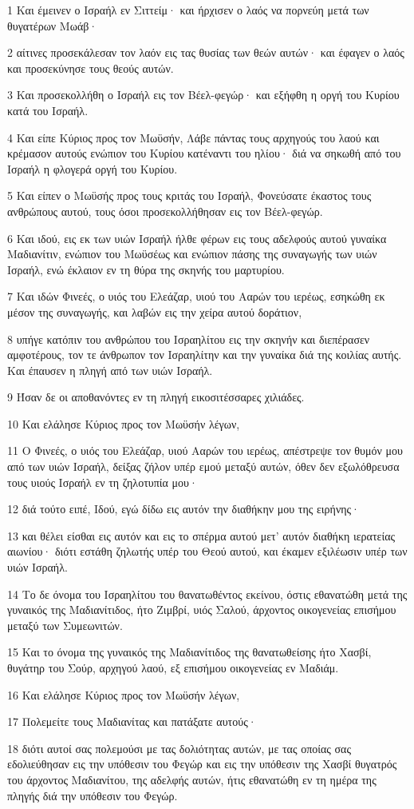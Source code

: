 \par 1 Και έμεινεν ο Ισραήλ εν Σιττείμ· και ήρχισεν ο λαός να πορνεύη μετά των θυγατέρων Μωάβ·
\par 2 αίτινες προσεκάλεσαν τον λαόν εις τας θυσίας των θεών αυτών· και έφαγεν ο λαός και προσεκύνησε τους θεούς αυτών.
\par 3 Και προσεκολλήθη ο Ισραήλ εις τον Βέελ-φεγώρ· και εξήφθη η οργή του Κυρίου κατά του Ισραήλ.
\par 4 Και είπε Κύριος προς τον Μωϋσήν, Λάβε πάντας τους αρχηγούς του λαού και κρέμασον αυτούς ενώπιον του Κυρίου κατέναντι του ηλίου· διά να σηκωθή από του Ισραήλ η φλογερά οργή του Κυρίου.
\par 5 Και είπεν ο Μωϋσής προς τους κριτάς του Ισραήλ, Φονεύσατε έκαστος τους ανθρώπους αυτού, τους όσοι προσεκολλήθησαν εις τον Βέελ-φεγώρ.
\par 6 Και ιδού, εις εκ των υιών Ισραήλ ήλθε φέρων εις τους αδελφούς αυτού γυναίκα Μαδιανίτιν, ενώπιον του Μωϋσέως και ενώπιον πάσης της συναγωγής των υιών Ισραήλ, ενώ έκλαιον εν τη θύρα της σκηνής του μαρτυρίου.
\par 7 Και ιδών Φινεές, ο υιός του Ελεάζαρ, υιού του Ααρών του ιερέως, εσηκώθη εκ μέσον της συναγωγής, και λαβών εις την χείρα αυτού δοράτιον,
\par 8 υπήγε κατόπιν του ανθρώπου του Ισραηλίτου εις την σκηνήν και διεπέρασεν αμφοτέρους, τον τε άνθρωπον τον Ισραηλίτην και την γυναίκα διά της κοιλίας αυτής. Και έπαυσεν η πληγή από των υιών Ισραήλ.
\par 9 Ήσαν δε οι αποθανόντες εν τη πληγή εικοσιτέσσαρες χιλιάδες.
\par 10 Και ελάλησε Κύριος προς τον Μωϋσήν λέγων,
\par 11 Ο Φινεές, ο υιός του Ελεάζαρ, υιού Ααρών του ιερέως, απέστρεψε τον θυμόν μου από των υιών Ισραήλ, δείξας ζήλον υπέρ εμού μεταξύ αυτών, όθεν δεν εξωλόθρευσα τους υιούς Ισραήλ εν τη ζηλοτυπία μου·
\par 12 διά τούτο ειπέ, Ιδού, εγώ δίδω εις αυτόν την διαθήκην μου της ειρήνης·
\par 13 και θέλει είσθαι εις αυτόν και εις το σπέρμα αυτού μετ' αυτόν διαθήκη ιερατείας αιωνίου· διότι εστάθη ζηλωτής υπέρ του Θεού αυτού, και έκαμεν εξιλέωσιν υπέρ των υιών Ισραήλ.
\par 14 Το δε όνομα του Ισραηλίτου του θανατωθέντος εκείνου, όστις εθανατώθη μετά της γυναικός της Μαδιανίτιδος, ήτο Ζιμβρί, υιός Σαλού, άρχοντος οικογενείας επισήμου μεταξύ των Συμεωνιτών.
\par 15 Και το όνομα της γυναικός της Μαδιανίτιδος της θανατωθείσης ήτο Χασβί, θυγάτηρ του Σούρ, αρχηγού λαού, εξ επισήμου οικογενείας εν Μαδιάμ.
\par 16 Και ελάλησε Κύριος προς τον Μωϋσήν λέγων,
\par 17 Πολεμείτε τους Μαδιανίτας και πατάξατε αυτούς·
\par 18 διότι αυτοί σας πολεμούσι με τας δολιότητας αυτών, με τας οποίας σας εδολιεύθησαν εις την υπόθεσιν του Φεγώρ και εις την υπόθεσιν της Χασβί θυγατρός του άρχοντος Μαδιανίτου, της αδελφής αυτών, ήτις εθανατώθη εν τη ημέρα της πληγής διά την υπόθεσιν του Φεγώρ.

